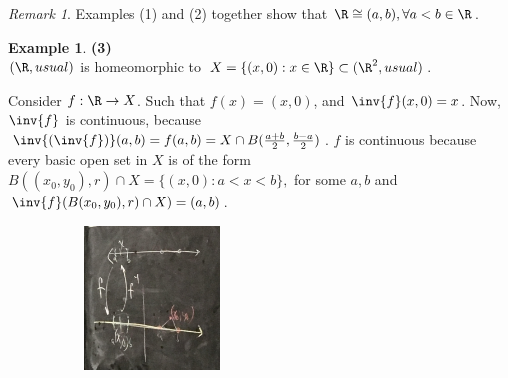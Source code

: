 \documentclass[a5paper]{article}
\theoremstyle{definition}%
\newtheorem*{example*}{Example}
\numberwithin{exercise}{section}
\theoremstyle{remark}%
\newtheorem*{remark*}{Remark}
\begin{document}
\begin{remark*}
Examples (1) and (2) together show that $\R\cong (a,b), \forall a<b\in\R$. 
\end{remark*}

\begin{example*}\textbf{(3)}\\
$(\R, usual)$ is homeomorphic to $X=\{(x,0):x\in\R\}\subset(\R^2, usual)$. 

Consider $f:\R \to X$. Such that $f(x)=(x,0)$, and $\inv{f}(x,0)=x$. Now, $\inv{f}$ is continuous, because $\inv{(\inv{f})}(a,b)=f(a,b)=X\cap B(\frac{a+b}{2},\frac{b-a}{2})$. $f$ is continuous because every basic open set in $X$ is of the form $B((x_0,y_0),r)\cap X=\{(x,0):a<x<b\},$ for some $a,b$ and $\inv{f}(B(x_0,y_0),r)\cap X)=(a,b)$. 

\begin{center}
\includegraphics[width=3in, height=1.5in]{images/line_r2_r_homeo}
\end{center}
\end{example*}
\end{document}
